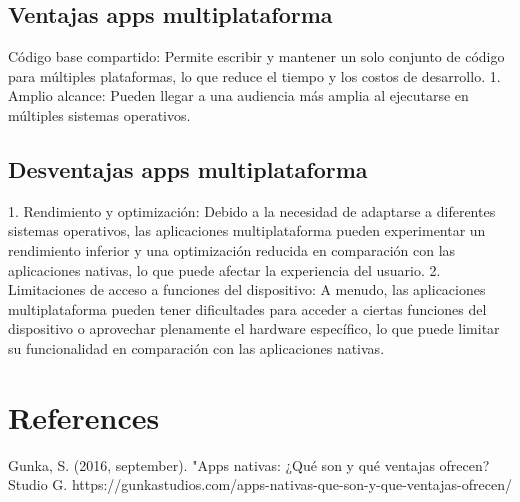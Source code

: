 \documentclass{article}
\begin{document}
\begin{multicols}{2}
		
		
		\subsection{Ventajas apps multiplataforma}
		Código base compartido: Permite escribir y mantener un solo conjunto de código para múltiples plataformas, lo que reduce el tiempo y los costos de desarrollo.
		1. Amplio alcance: Pueden llegar a una audiencia más amplia al ejecutarse en múltiples sistemas operativos.
		\subsection{Desventajas apps multiplataforma}
		
		1. Rendimiento y optimización: Debido a la necesidad de adaptarse a diferentes sistemas operativos, las aplicaciones multiplataforma pueden experimentar un rendimiento inferior y una optimización reducida en comparación con las aplicaciones nativas, lo que puede afectar la experiencia del usuario.
		2. Limitaciones de acceso a funciones del dispositivo: A menudo, las aplicaciones multiplataforma pueden tener dificultades para acceder a ciertas funciones del dispositivo o aprovechar plenamente el hardware específico, lo que puede limitar su funcionalidad en comparación con las aplicaciones nativas.
		
		
	\end{multicols} 
	\section{References}
	Gunka, S. (2016, september). "Apps nativas: ¿Qué son y qué ventajas ofrecen? Studio G. https://gunkastudios.com/apps-nativas-que-son-y-que-ventajas-ofrecen/
	
	
\end{document}
